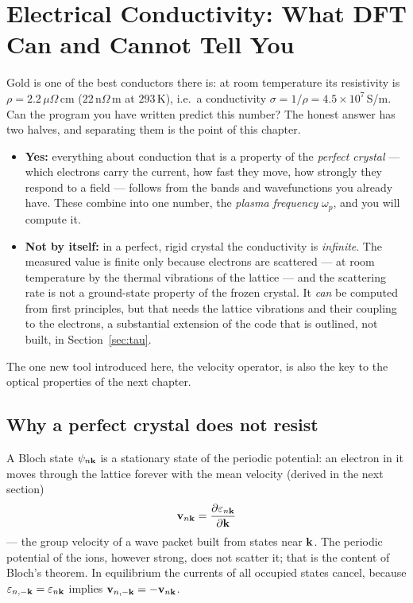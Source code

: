 \chapter{Electrical Conductivity: What DFT Can and Cannot Tell You}
\label{ch:conductivity}


Gold is one of the best conductors there is: at room temperature its
resistivity is $\rho = 2.2\,\mu\Omega\,$cm ($22$\,n$\Omega$\,m at
$293$\,K), i.e.\ a conductivity
$\sigma = 1/\rho = 4.5\times10^{7}$\,S/m. Can the program you have written
predict this number? The honest answer has two halves, and separating them
is the point of this chapter.
\begin{itemize}[leftmargin=2em]
\item \textbf{Yes:} everything about conduction that is a property of the
\emph{perfect crystal} --- which electrons carry the current, how fast they
move, how strongly they respond to a field --- follows from the bands and
wavefunctions you already have. These combine into one number, the
\emph{plasma frequency} $\omega_p$, and you will compute it.
\item \textbf{Not by itself:} in a perfect, rigid crystal the conductivity
is \emph{infinite}. The measured value is finite only because electrons are
scattered --- at room temperature by the thermal vibrations of the lattice
--- and the scattering rate is not a ground-state property of the frozen
crystal. It \emph{can} be computed from first principles, but that needs
the lattice vibrations and their coupling to the electrons, a substantial
extension of the code that is outlined, not built, in
Section~\ref{sec:tau}.
\end{itemize}
The one new tool introduced here, the velocity operator, is also the key to
the optical properties of the next chapter.

\section{Why a perfect crystal does not resist}

A Bloch state $\psi_{n\mathbf{k}}$ is a stationary state of the periodic
potential: an electron in it moves through the lattice forever with the
mean velocity (derived in the next section)
\begin{equation}
\mathbf v_{n\mathbf{k}} = \frac{\partial \varepsilon_{n\mathbf{k}}}{\partial \mathbf{k}}
\label{eq:groupvel}
\end{equation}
--- the group velocity of a wave packet built from states near $\mathbf{k}$. The
periodic potential of the ions, however strong, does not scatter it; that
is the content of Bloch's theorem. In equilibrium the currents of all
occupied states cancel, because $\varepsilon_{n,-\mathbf{k}} = \varepsilon_{n\mathbf{k}}$
implies $\mathbf v_{n,-\mathbf{k}} = -\mathbf v_{n\mathbf{k}}$.

